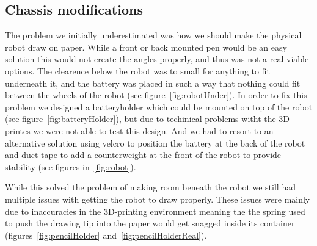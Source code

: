 \subsection{Chassis modifications}
The problem we initially underestimated was how we should make the physical robot draw on paper. While a front or back mounted pen would be an easy solution this would not create the angles properly, and thus was not a real viable options. The clearence below the robot was to small for anything to fit underneath it, and the battery was placed in such a way that nothing could fit between the wheels of the robot (see figure~\ref{fig:robotUnder}). In order to fix this problem we designed a batteryholder which could be mounted on top of the robot (see figure~\ref{fig:batteryHolder}), but due to techinical problems witht the 3D printes we were not able to test this design. And we had to resort to an alternative solution using velcro to position the battery at the back of the robot and duct tape to add a counterweight at the front of the robot to provide stability (see figures in~\ref{fig:robot}). 

\bigskip\noindent
While this solved the problem of making room beneath the robot we still had multiple issues with getting the robot to draw properly. These issues were mainly due to inaccuracies in the 3D-printing environment meaning the the spring used to push the drawing tip into the paper would get snagged inside its container (figures~\ref{fig:pencilHolder} and~\ref{fig:pencilHolderReal}).


